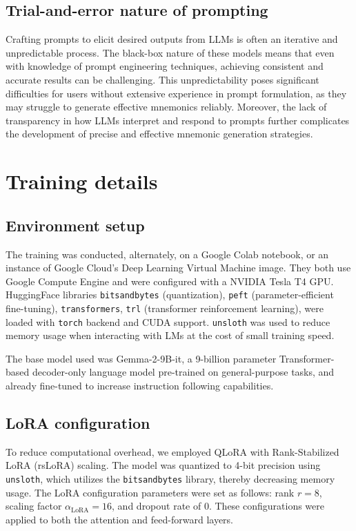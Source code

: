\documentclass{article}
\newcounter{para}
\begin{document}
\subsection{Trial-and-error nature of prompting}

Crafting prompts to elicit desired outputs from LLMs is often an iterative and unpredictable process. The black-box nature of these models means that even with knowledge of prompt engineering techniques, achieving consistent and accurate results can be challenging. This unpredictability poses significant difficulties for users without extensive experience in prompt formulation, as they may struggle to generate effective mnemonics reliably. Moreover, the lack of transparency in how LLMs interpret and respond to prompts further complicates the development of precise and effective mnemonic generation strategies.

\section{Training details} \label{sec:training-details}
\subsection{Environment setup}
The training was conducted, alternately, on a Google Colab notebook, or an instance of Google Cloud's Deep Learning Virtual Machine image. They both use Google Compute Engine and were configured with a NVIDIA Tesla T4 GPU. HuggingFace libraries \verb|bitsandbytes| (quantization), \verb|peft| (parameter-efficient fine-tuning), \verb|transformers|, \verb|trl| (transformer reinforcement learning), were loaded with \verb|torch| backend and CUDA support. \verb|unsloth| was used to reduce memory usage when interacting with LMs at the cost of small training speed.

The base model used was Gemma-2-9B-it, a 9-billion parameter Transformer-based decoder-only language model pre-trained on general-purpose tasks, and already fine-tuned to increase instruction following capabilities.

\subsection{LoRA configuration}

To reduce computational overhead, we employed QLoRA with Rank-Stabilized LoRA (rsLoRA) scaling. The model was quantized to 4-bit precision using \texttt{unsloth}, which utilizes the \texttt{bitsandbytes} library, thereby decreasing memory usage. The LoRA configuration parameters were set as follows: rank \( r = 8 \), scaling factor \( \alpha_{\text{LoRA}} = 16 \), and dropout rate of 0. These configurations were applied to both the attention and feed-forward layers.
\end{document}
